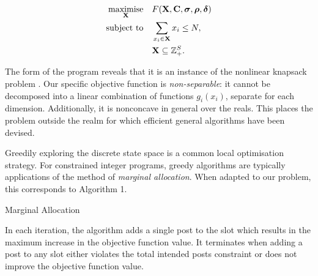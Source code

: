 \documentclass[onecolumn, 12 pt, doublespace, fullpage, letterpaper]{report}
\begin{document}
\begin{equation}
  \begin{aligned}
    \underset{\mathbf{X}\quad}{\text{maximise\quad}}& F(\mathbf{X}, \mathbf{C}, \boldsymbol\sigma, \boldsymbol\rho, \boldsymbol\delta)\\
    \text{subject to\quad}& \sum_{x_i \in \mathbf{X}} x_i \leq N, \\
                          & \mathbf{X} \subseteq \mathbb{Z}^S_+.\\
  \end{aligned}
\end{equation}

The form of the program reveals that it is an instance of the nonlinear knapsack problem \cite{bretthauer2002nonlinear}. Our specific objective function is \textit{non-separable}: it cannot be decomposed into a linear combination of functions $g_i(x_i)$, separate for each dimension. Additionally, it is nonconcave in general over the reals. This places the problem outside the realm for which efficient general algorithms have been devised.

Greedily exploring the discrete state space is a common local optimisation strategy. For constrained integer programs, greedy algorithms are typically applications of the method of \textit{marginal allocation}. When adapted to our problem, this corresponds to Algorithm 1.

\begin{algorithm}[h!]
       \DontPrintSemicolon
       \caption{Marginal Allocation}
\end{algorithm}

In each iteration, the algorithm adds a single post to the slot which results in the maximum increase in the objective function value. It terminates when adding a post to any slot either violates the total intended posts constraint or does not improve the objective function value.
\end{document}
